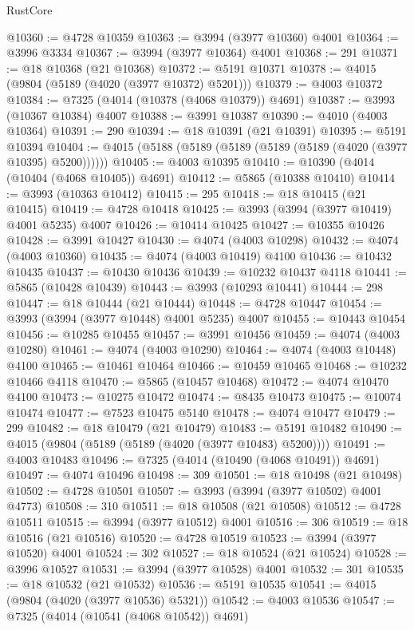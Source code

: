 \begin{lexlean}{RustCore}
\begin{coremodule}
@10360 := @4728 @10359
@10363 := @3994 (@3977 @10360) @4001
@10364 := @3996 @3334
@10367 := @3994 (@3977 @10364) @4001
@10368 := 291
@10371 := @18 @10368 (@21 @10368)
@10372 := @5191 @10371
@10378 := @4015 (@9804 (@5189 (@4020 (@3977 @10372) @5201)))
@10379 := @4003 @10372
@10384 := @7325 (@4014 (@10378 (@4068 @10379)) @4691)
@10387 := @3993 (@10367 @10384) @4007
@10388 := @3991 @10387
@10390 := @4010 (@4003 @10364)
@10391 := 290
@10394 := @18 @10391 (@21 @10391)
@10395 := @5191 @10394
@10404 := @4015 (@5188 (@5189 (@5189 (@5189 (@5189 (@4020 (@3977 @10395) @5200))))))
@10405 := @4003 @10395
@10410 := @10390 (@4014 (@10404 (@4068 @10405)) @4691)
@10412 := @5865 (@10388 @10410)
@10414 := @3993 (@10363 @10412)
@10415 := 295
@10418 := @18 @10415 (@21 @10415)
@10419 := @4728 @10418
@10425 := @3993 (@3994 (@3977 @10419) @4001 @5235) @4007
@10426 := @10414 @10425
@10427 := @10355 @10426
@10428 := @3991 @10427
@10430 := @4074 (@4003 @10298)
@10432 := @4074 (@4003 @10360)
@10435 := @4074 (@4003 @10419) @4100
@10436 := @10432 @10435
@10437 := @10430 @10436
@10439 := @10232 @10437 @4118
@10441 := @5865 (@10428 @10439)
@10443 := @3993 (@10293 @10441)
@10444 := 298
@10447 := @18 @10444 (@21 @10444)
@10448 := @4728 @10447
@10454 := @3993 (@3994 (@3977 @10448) @4001 @5235) @4007
@10455 := @10443 @10454
@10456 := @10285 @10455
@10457 := @3991 @10456
@10459 := @4074 (@4003 @10280)
@10461 := @4074 (@4003 @10290)
@10464 := @4074 (@4003 @10448) @4100
@10465 := @10461 @10464
@10466 := @10459 @10465
@10468 := @10232 @10466 @4118
@10470 := @5865 (@10457 @10468)
@10472 := @4074 @10470 @4100
@10473 := @10275 @10472
@10474 := @8435 @10473
@10475 := @10074 @10474
@10477 := @7523 @10475 @5140
@10478 := @4074 @10477
@10479 := 299
@10482 := @18 @10479 (@21 @10479)
@10483 := @5191 @10482
@10490 := @4015 (@9804 (@5189 (@5189 (@4020 (@3977 @10483) @5200))))
@10491 := @4003 @10483
@10496 := @7325 (@4014 (@10490 (@4068 @10491)) @4691)
@10497 := @4074 @10496
@10498 := 309
@10501 := @18 @10498 (@21 @10498)
@10502 := @4728 @10501
@10507 := @3993 (@3994 (@3977 @10502) @4001 @4773)
@10508 := 310
@10511 := @18 @10508 (@21 @10508)
@10512 := @4728 @10511
@10515 := @3994 (@3977 @10512) @4001
@10516 := 306
@10519 := @18 @10516 (@21 @10516)
@10520 := @4728 @10519
@10523 := @3994 (@3977 @10520) @4001
@10524 := 302
@10527 := @18 @10524 (@21 @10524)
@10528 := @3996 @10527
@10531 := @3994 (@3977 @10528) @4001
@10532 := 301
@10535 := @18 @10532 (@21 @10532)
@10536 := @5191 @10535
@10541 := @4015 (@9804 (@4020 (@3977 @10536) @5321))
@10542 := @4003 @10536
@10547 := @7325 (@4014 (@10541 (@4068 @10542)) @4691)

\end{coremodule}
\end{lexlean}
